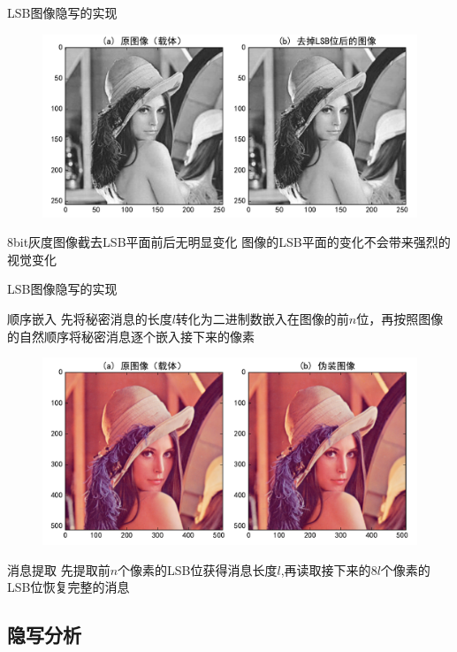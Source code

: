 \documentclass[14pt]{Bredelebeamer}
\begin{document}
\begin{frame}{LSB图像隐写的实现}
    \begin{figure}
      \centering
      \includegraphics[width=.9\textwidth]{images/demo1}
    \end{figure}
    \begin{alertblock}{8bit灰度图像截去LSB平面前后无明显变化}
      图像的LSB平面的变化不会带来强烈的视觉变化
    \end{alertblock}
\end{frame}

\begin{frame}{LSB图像隐写的实现}
  \begin{block}{顺序嵌入}
    先将秘密消息的长度$l$转化为二进制数嵌入在图像的前$n$位，再按照图像的自然顺序将秘密消息逐个嵌入接下来的像素
  \end{block}
  \begin{figure}
    \centering
    \includegraphics[width=.7\textwidth]{images/gettys}
  \end{figure}
  \begin{exampleblock}{消息提取}
    先提取前$n$个像素的LSB位获得消息长度$l$,再读取接下来的$8l$个像素的LSB位恢复完整的消息
  \end{exampleblock}
\end{frame}

\subsection{隐写分析}
\end{document}
